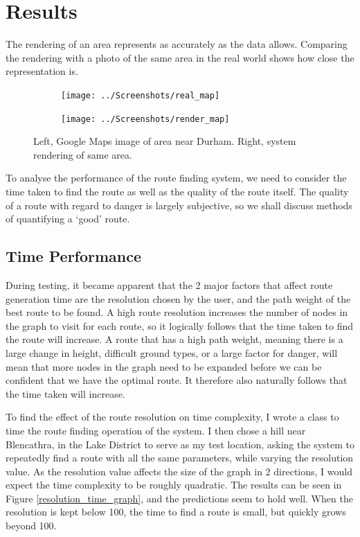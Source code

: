 \documentclass[12pt,a4paper]{article}
\begin{document}
  \section{Results}
  \noindent The rendering of an area represents as accurately as the data allows. Comparing the rendering with a photo of the same area in the real world shows how close the representation is.

  \begin{figure}
    \begin{subfigure}{0.46\textwidth}
      \centering
      \texttt{[image: ../Screenshots/real\_map]}
    \end{subfigure}
    \begin{subfigure}{0.5\textwidth}
      \centering
      \texttt{[image: ../Screenshots/render\_map]}
    \end{subfigure}
    \caption{Left, Google Maps image of area near Durham.\cite{gmaps} Right, system rendering of same area.}
  \end{figure}

  \par To analyse the performance of the route finding system, we need to consider the time taken to find the route as well as the quality of the route itself. The quality of a route with regard to danger is largely subjective, so we shall discuss methods of quantifying a `good' route.

  \subsection{Time Performance}
  \noindent During testing, it became apparent that the 2 major factors that affect route generation time are the resolution chosen by the user, and the path weight of the best route to be found. A high route resolution increases the number of nodes in the graph to visit for each route, so it logically follows that the time taken to find the route will increase. A route that has a high path weight, meaning there is a large change in height, difficult ground types, or a large factor for danger, will mean that more nodes in the graph need to be expanded before we can be confident that we have the optimal route. It therefore also naturally follows that the time taken will increase.
  \par To find the effect of the route resolution on time complexity, I wrote a class to time the route finding operation of the system. I then chose a hill near Blencathra, in the Lake District to serve as my test location, asking the system to repeatedly find a route with all the same parameters, while varying the resolution value. As the resolution value affects the size of the graph in 2 directions, I would expect the time complexity to be roughly quadratic. The results can be seen in Figure \ref{resolution_time_graph}, and the predictions seem to hold well. When the resolution is kept below 100, the time to find a route is small, but quickly grows beyond 100.
\end{document}
